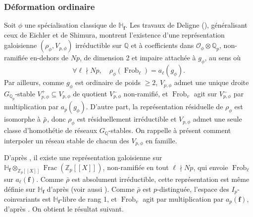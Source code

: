 \documentclass[12pt]{amsart}
\newcommand\bQ{\mathbb{Q}}
\newcommand\bH{\mathbb{H}}
\newcommand\Zp{{\mathbb{Z}_{p}}}
\newcommand\Qp{\mathbb{Q}_{p}}
\newcommand\cO{\mathcal{O}}
\newcommand{\ob}[1]{\mkern 1.5mu\overline{\mkern-1.5mu#1\mkern-1.5mu}\mkern 1.5mu}
\DeclareMathOperator{\Frac}{Frac}
\DeclareMathOperator{\Frob}{Frob}
\theoremstyle{defstyle}
\theoremstyle{thmstyle}
\begin{document}
\subsubsection{Déformation ordinaire}
Soit $\phi$ une spécialisation classique de $\bH_\textbf{f}$. Les travaux de Deligne (\cite{deligne1971formes}), généralisant ceux de Eichler et de Shimura, montrent l'existence d'une représentation galoisienne $(\rho_\phi,V_{p,\phi})$ irréductible sur $\bQ$ et à coefficients dans $\cO_\phi \otimes \Qp$, non-ramifiée en-dehors de $Np$, de dimension 2 et impaire attachée à $g_\phi$, au sens où
$$\forall \ell \nmid Np,\quad \rho_\phi(\Frob_\ell)=a_\ell(g_\phi).$$
Par ailleurs, comme $g_\phi$ est ordinaire de poids $\geq 2$, $V_{p,\phi}$ admet une unique droite $G_{\Qp}$-stable $V^+_{p,\phi} \subseteq V_{p,\phi}$ de quotient  $V_{p,\phi}^-$ non-ramifié, et $\Frob_v$ agit sur $V_{p,\phi}^-$ par multiplication par $a_p(g_\phi)$. D'autre part, la représentation résiduelle de $\rho_\phi$ est isomorphe à $\ob{\rho}$, donc $\rho_\phi$ est résiduellement irréductible et $V_{p,\phi}$ admet une seule classe d'homothétie de réseaux $G_{\bQ}$-stables. On rappelle à présent comment interpoler un réseau stable de chacun des $V_{p,\phi}$ en famille. 

D'après \cite[Theorem 2.1]{hida1986galois}, il existe une représentation galoisienne sur $\bH_\textbf{f} \otimes_{\Zp[[X]]} \Frac(\Zp[[X]])$, non-ramifiée en tout $\ell \nmid Np$, qui envoie $\Frob_\ell$ sur $a_\ell(\textbf{f})$. Comme $\bar{\rho}$ est absolument irréductible, cette représentation est même définie sur $\bH_\textbf{f}$ d'après \cite[Théorème 1]{nyssen1996pseudo}  (voir aussi \cite[Corollaire 5.2]{rouquier1996caracterisation}). Comme $\bar{\rho}$ est $p$-distinguée, l'espace des $I_p$-coinvariants est $\bH_\textbf{f}$-libre de rang 1, et $\Frob_v$ agit par multiplication par $a_p(\textbf{f})$, d'après \cite[Theorem 2.2.2]{wiles1988ordinary}. On obtient le résultat suivant.
\end{document}
